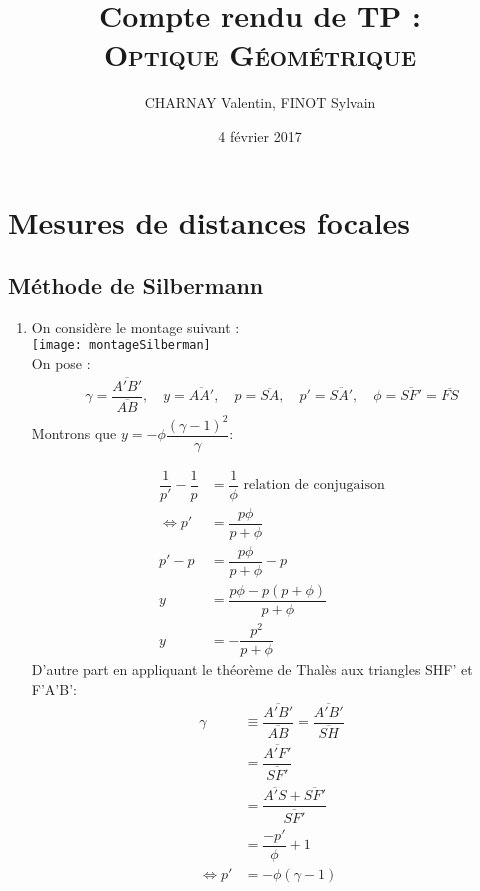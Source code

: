 \documentclass[12pt,a4paper]{article}
\author{CHARNAY Valentin, FINOT Sylvain}
\title{Compte rendu de TP :\\ \scshape Optique Géométrique}
\date{4 février 2017}
\begin{document}
	\maketitle
	\section{Mesures de distances focales}
	\subsection{Méthode de Silbermann}
	\begin{enumerate}
		\item 
		On considère le montage suivant :\\
		\texttt{[image: montageSilberman]}\\
		On pose : 
		$$
		\begin{aligned}
		\gamma = \dfrac{\overline{A'B'}}{\overline{AB}} ,\quad y=\overline{AA'},\quad p=\overline{SA},\quad p'=\overline{SA'},\quad \phi=\overline{SF'}=\overline{FS}
		\end{aligned}
		$$
		Montrons que $y=-\phi\dfrac{{(\gamma-1)}^2}{\gamma}$:
		\begin{multicols}{2}
			\begingroup
			\addtolength{\jot}{1em}
			\noindent
			\begin{align*}
			\dfrac{1}{p'}-\dfrac{1}{p}&=\dfrac{1}{\phi} \text{ relation de conjugaison}\\
			\iff p'&=\dfrac{p\phi}{p+\phi}\\
			p'-p &= \dfrac{p\phi}{p+\phi}-p\\
			y &= \dfrac{p\phi-p(p+\phi)}{p+\phi}\\
			y&=-\dfrac{p^2}{p+\phi}
			\end{align*}
			\endgroup
			\setlength\columnseprule{0.4pt}
			\vfill
			\columnbreak
			D'autre part en appliquant le théorème de Thalès aux triangles SHF' et F'A'B':
			\begingroup
			\addtolength{\jot}{1em}
			\noindent
			\begin{align*}
			\gamma&\equiv\dfrac{\overline{A'B'}}{\overline{AB}} = \dfrac{\overline{A'B'}}{\overline{SH}}\\
			&=\dfrac{\overline{A'F'}}{\overline{SF'}}\\
			&=\dfrac{\overline{A'S}+\overline{SF'}}{\overline{SF'}}\\
			&=\dfrac{-p'}{\phi}+1\\
			\iff p' &= -\phi(\gamma-1)
			\end{align*}
			\endgroup
		\end{multicols}

\end{enumerate}
\end{document}
